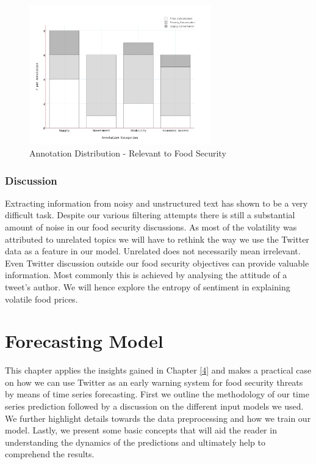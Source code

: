 \begin{figure}[H]
        \centering
         \includegraphics[width=0.7\textwidth ]{img/anal/annotation_dist}
              
        \caption{Annotation Distribution - Relevant to Food Security}
        \label{fig:annotation_dist}
\end{figure}


\subsection{Discussion}

Extracting information from noisy and unstructured text has shown to be a very difficult task. Despite our various filtering attempts there is still a substantial amount of noise in our food security discussions. As most of the volatility was attributed to unrelated topics we will have to rethink the way we use the Twitter data as a feature in our model. Unrelated does not necessarily mean irrelevant. Even Twitter discussion outside our food security objectives can provide valuable information. Most commonly this is achieved by analysing the attitude of a tweet's author. We will hence explore the entropy of sentiment in explaining volatile food prices. 


\chapter{Forecasting Model}


This chapter applies the insights gained in Chapter \ref{4} and makes a practical case on how we can use Twitter as an early warning system for food security threats by means of time series forecasting. First we  outline the methodology of our time series prediction followed by a discussion on the different input models we used. We further highlight details towards the data preprocessing and how we train our model. Lastly,  we present some basic concepts that will aid the reader in understanding the dynamics of the predictions and ultimately help to comprehend the results.  

